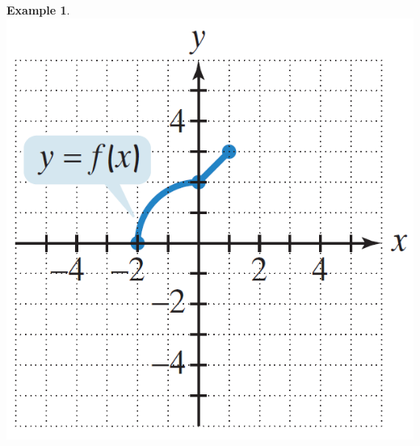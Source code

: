 \documentclass[addpoints,12pt]{exam}
\theoremstyle{definition}
\newtheorem{example}{Example}[subsection]
\begin{document}
\begin{example}
\begin{minipage}{.5\textwidth}
\includegraphics[scale=.4]{images/dom_rang_02}
\end{minipage}%
\vspace{1in}


\end{example}
\end{document}
